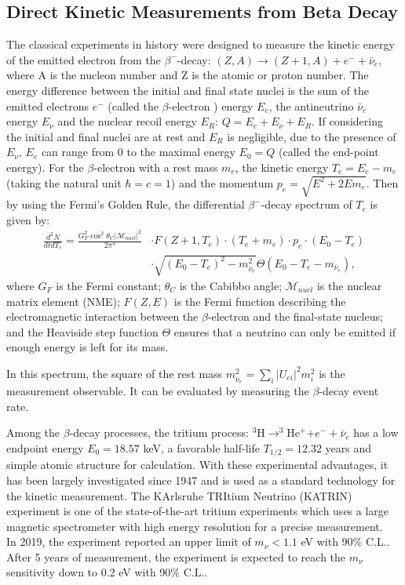 \subsection{Direct Kinetic Measurements from Beta Decay}\label{section:directMeasure}
The classical experiments in history were designed to measure the kinetic energy of the emitted electron from the $\beta^-$-decay: $(Z,A)\to (Z+1,A)+e^-+\bar{\nu}_e$, where A is the nucleon number and Z is the atomic or proton number. The energy difference between the initial and final state nuclei is the sum of the emitted electrons $e^-$ (called the $\beta$-electron ) energy $E_e$, the antineutrino $\bar{\nu}_e$ energy $E_\nu$ and the nuclear recoil energy $E_R$: $Q=E_e+E_\nu+E_R$. If considering the initial and final nuclei are at rest and $E_R$ is negligible, due to the presence of $E_\nu$, $E_e$ can range from 0 to the maximal energy $E_0=Q$ (called the end-point energy). For the $\beta$-electron with a rest mass $m_e$, the kinetic energy $T_e=E_e-m_e$ (taking the natural unit $\hbar=c=1$) and the momentum $p_e=\sqrt{E^2+2Em_e}$. Then by using the Fermi's Golden Rule, the differential $\beta^-$-decay spectrum of $T_e$ is given by\cite{rottele2019tritium}:
\begin{equation}\label{eq:beta-decay}
\begin{aligned}
\frac{d^2N}{dtdT_e} = \frac{G_F^2\cos^2\theta_C|\mathcal{M}_{nucl}|^2}{2\pi^3} &\cdot F(Z+1,T_e)\cdot(T_e+m_e)\cdot p_e\cdot (E_0-T_e)\\
&
\cdot \sqrt{(E_0-T_e)^2-m^2_{\bar{\nu}_e}}\Theta(E_0-T_e-m_{\bar{\nu}_e}),
\end{aligned}
\end{equation}
where $G_F$ is the Fermi constant; $\theta_C$ is the Cabibbo angle; $\mathcal{M}_{nucl}$ is the nuclear matrix element (NME); $F(Z,E)$ is the Fermi function describing the electromagnetic interaction between the $\beta$-electron and the final-state nucleus; and the Heaviside step function $\Theta$ ensures that a neutrino can only be emitted if enough energy is left for its mass.

In this spectrum, the square of the rest mass $m^2_{\bar{\nu}_e}=\sum_i |U_{ei}|^2 m_i^2$ is the measurement observable. It can be evaluated by measuring the $\beta$-decay event rate\cite{rottele2019tritium}.

Among the $\beta$-decay processes, the tritium process: $^3$H$\to^3$He$^+$+$e^-+\bar{\nu}_e$ has a low endpoint energy $E_0=18.57$ keV, a favorable half-life $T_{1/2}=12.32$ years and simple atomic structure for calculation. With these experimental advantages, it has been largely investigated since 1947 and is used as a standard technology for the kinetic measurement\cite{fukugita2013physics}. The KArlsruhe TRItium Neutrino (KATRIN) experiment is one of the state-of-the-art tritium experiments which uses a large magnetic spectrometer with high energy resolution for a precise measurement.　In 2019, the experiment reported an upper limit of $m_\nu<1.1$ eV with 90\% C.L.. After 5 years of measurement, the experiment is expected to reach the $m_\nu$ sensitivity down to 0.2 eV with 90\% C.L.\cite{aker2019improved}.

